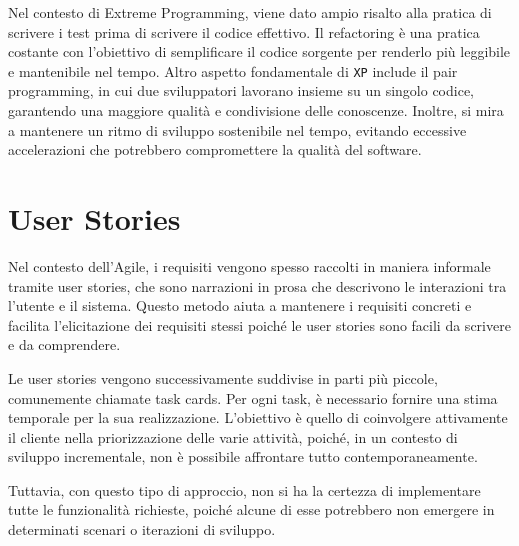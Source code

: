 Nel contesto di Extreme Programming, viene dato ampio risalto alla pratica di scrivere i test prima di scrivere il codice effettivo.
Il refactoring è una pratica costante con l'obiettivo di semplificare il codice sorgente per renderlo più leggibile e mantenibile nel
tempo. Altro aspetto fondamentale di \texttt{XP} include il pair programming, in cui due sviluppatori lavorano insieme su un singolo codice,
garantendo una maggiore qualità e condivisione delle conoscenze. Inoltre, si mira a mantenere un ritmo di sviluppo sostenibile nel tempo,
evitando eccessive accelerazioni che potrebbero compromettere la qualità del software.

\section{User Stories}
Nel contesto dell'Agile, i requisiti vengono spesso raccolti in maniera informale tramite user stories, che sono narrazioni in prosa
che descrivono le interazioni tra l'utente e il sistema. Questo metodo aiuta a mantenere i requisiti concreti e facilita l'elicitazione
dei requisiti stessi poiché le user stories sono facili da scrivere e da comprendere.

Le user stories vengono successivamente suddivise in parti più piccole, comunemente chiamate task cards. Per ogni task, è necessario
fornire una stima temporale per la sua realizzazione. L'obiettivo è quello di coinvolgere attivamente il cliente nella priorizzazione
delle varie attività, poiché, in un contesto di sviluppo incrementale, non è possibile affrontare tutto contemporaneamente.

Tuttavia, con questo tipo di approccio, non si ha la certezza di implementare tutte le funzionalità richieste, poiché alcune di esse
potrebbero non emergere in determinati scenari o iterazioni di sviluppo.
